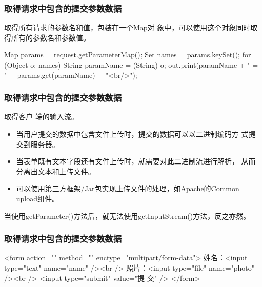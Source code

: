 \begin{frame}[fragile] %
  \frametitle{取得请求中包含的提交参数数据} 

   取得所有请求的参数名和值，包装在一个Map对
  象中，可以使用这个对象同时取得所有的参数名和参数值。

  \begin{javaCode}
    Map params = request.getParameterMap();
    Set names = params.keySet();
    for (Object o: names) {
      String paramName = (String) o;
      out.print(paramName + " = " + params.get(paramName) + "<br/>");
    }
  \end{javaCode}
\end{frame}

\begin{frame} %
  \frametitle{取得请求中包含的提交参数数据} 

   取得客户
  端的输入流。

  \begin{itemize}
  \item 当用户提交的数据中包含文件上传时，提交的数据可以以二进制编码方
    式提交到服务器。
  \item 当表单既有文本字段还有文件上传时，就需要对此二进制流进行解析，
    从而分离出文本和上传文件。
  \item 可以使用第三方框架/Jar包实现上传文件的处理，如{\kai\Blue Apache的Common
      upload组件}。
  \end{itemize}


  {\kai 当使用getParameter()方法后，就无法使用getInputStream()方法，反之亦然。}


\end{frame}

\begin{frame} %
  \frametitle{取得请求中包含的提交参数数据} 

  \begin{xmlCode}
    <form action="" method="" enctype="multipart/form-data">
      姓名：<input type="text" name="name" /><br />
      照片：<input type="file" name="photo" /><br />
      <input type="submit" value="提 交" />
    </form>
\end{xmlCode}
\end{frame}

